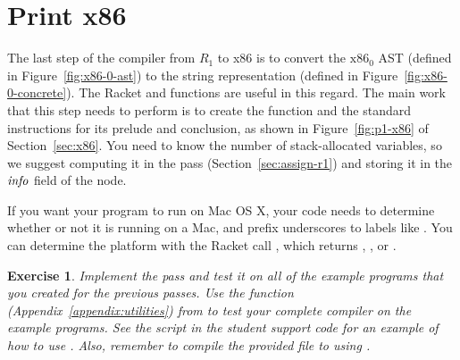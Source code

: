 \documentclass[11pt]{book}
\newtheorem{exercise}[theorem]{Exercise}
\begin{document}
\section{Print x86}
\label{sec:print-x86}

The last step of the compiler from $R_1$ to x86 is to convert the
$\text{x86}_0$ AST (defined in Figure~\ref{fig:x86-0-ast}) to the
string representation (defined in Figure~\ref{fig:x86-0-concrete}). The Racket
 and  functions are useful in this
regard. The main work that this step needs to perform is to create the
 function and the standard instructions for its prelude and
conclusion, as shown in Figure~\ref{fig:p1-x86} of
Section~\ref{sec:x86}. You need to know the number of stack-allocated
variables, so we suggest computing it in the  pass
(Section~\ref{sec:assign-r1}) and storing it in the $\mathit{info}$ field
of the  node.




If you want your program to run on Mac OS X, your code needs to
determine whether or not it is running on a Mac, and prefix
underscores to labels like .  You can determine the platform
with the Racket call , which returns
, , or .  

\begin{exercise}
\normalfont Implement the  pass and test it on all of
the example programs that you created for the previous passes. Use the
 function (Appendix~\ref{appendix:utilities}) from
 to test your complete compiler on the example
programs.  See the  script in the student support
code for an example of how to use . Also, remember
to compile the provided  file to  using
.
\end{exercise}
\end{document}
